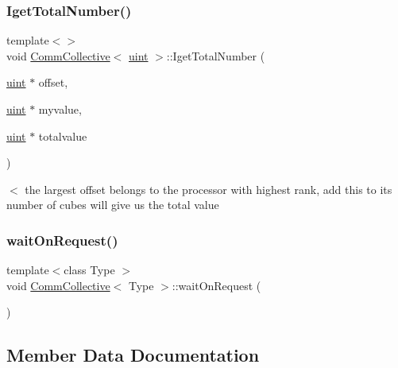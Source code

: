 \subsubsection{\texorpdfstring{Iget\+Total\+Number()}{IgetTotalNumber()}\hspace{0.1cm}{\footnotesize\ttfamily [2/2]}}
{\footnotesize\ttfamily template$<$$>$ \\
void \mbox{\hyperlink{classCommCollective}{Comm\+Collective}}$<$ \mbox{\hyperlink{definitions_8h_a69aa29b598b851b0640aa225a9e5d61d}{uint}} $>$\+::Iget\+Total\+Number (\begin{DoxyParamCaption}\item[{\mbox{\hyperlink{definitions_8h_a69aa29b598b851b0640aa225a9e5d61d}{uint}} $\ast$}]{offset,  }\item[{\mbox{\hyperlink{definitions_8h_a69aa29b598b851b0640aa225a9e5d61d}{uint}} $\ast$}]{myvalue,  }\item[{\mbox{\hyperlink{definitions_8h_a69aa29b598b851b0640aa225a9e5d61d}{uint}} $\ast$}]{totalvalue }\end{DoxyParamCaption})}

$<$ the largest offset belongs to the processor with highest rank, add this to its number of cubes will give us the total value \mbox{\label{classCommCollective_af9b5d68df879f888a107009d783e20f6}} 
\subsubsection{\texorpdfstring{wait\+On\+Request()}{waitOnRequest()}}
{\footnotesize\ttfamily template$<$class Type $>$ \\
void \mbox{\hyperlink{classCommCollective}{Comm\+Collective}}$<$ Type $>$\+::wait\+On\+Request (\begin{DoxyParamCaption}{ }\end{DoxyParamCaption})}



\subsection{Member Data Documentation}
\mbox{\label{classCommCollective_aec8e1d1172950f2f5a2f47a50de151e7}} 
